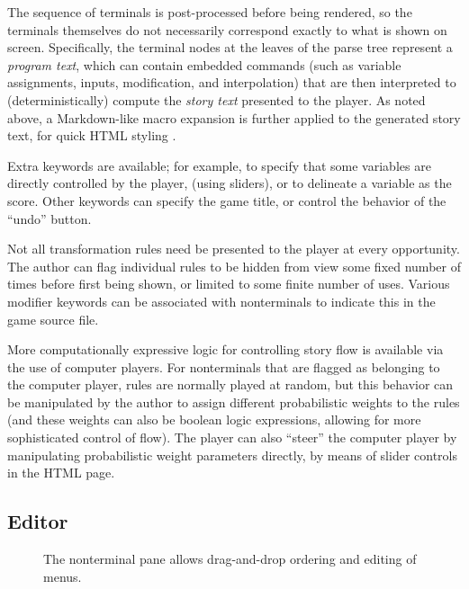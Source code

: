 \documentclass{acm_proc_article-sp}
\begin{document}
The sequence of terminals is post-processed before being rendered,
so the terminals themselves do not necessarily correspond exactly to what is shown on screen.
Specifically, the terminal nodes at the leaves of the parse tree represent a {\em program text},
which can contain embedded commands (such as variable assignments, inputs, modification, and interpolation)
that are then interpreted to (deterministically) compute the {\em story text} presented to the player.
As noted above, a Markdown-like macro expansion is further applied to the generated story text,
for quick HTML styling \cite{Markdown}.

Extra keywords are available; for example, to specify that some variables are directly controlled by the player,
(using sliders), or to delineate a variable as the score.
Other keywords can specify the game title, or control the behavior of the ``undo'' button.

Not all transformation rules need be presented to the player at every opportunity.
The author can flag individual rules to be hidden from view some fixed number of times
before first being shown, or limited to some finite number of uses.
Various modifier keywords can be associated with nonterminals to indicate this in the game source file.

More computationally expressive logic for controlling story flow is available via the use of computer players.
For nonterminals that are flagged as belonging to the computer player,
rules are normally played at random,
but this behavior can be manipulated by the author to
assign different probabilistic weights to the rules
(and these weights can also be boolean logic expressions, allowing for more sophisticated control of flow).
The player can also ``steer'' the computer player by manipulating probabilistic weight parameters directly,
by means of slider controls in the HTML page.

\subsection{Editor}

\begin{figure}
\caption{
\label{fig:editor}
The nonterminal pane allows drag-and-drop ordering and editing of menus.
}
\end{figure}
\end{document}
